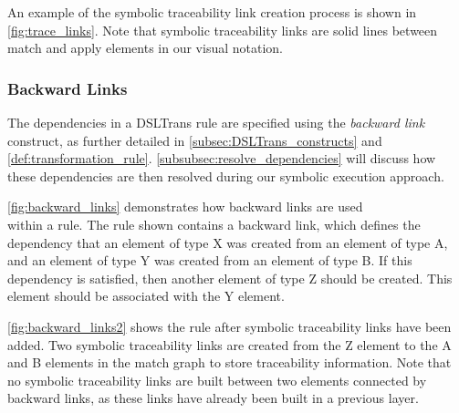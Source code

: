 An example of the symbolic traceability link creation process is shown in
\cref{fig:trace_links}. Note that symbolic traceability links are solid lines between
match and apply elements in our visual notation.



\subsubsection{Backward Links}
\label{subsubsec:backward_links}

The dependencies in a DSLTrans rule are specified using the \textit{backward link} construct, as further detailed in \cref{subsec:DSLTrans_constructs} and \cref{def:transformation_rule}. \cref{subsubsec:resolve_dependencies} will discuss how these dependencies are then resolved during our symbolic execution approach.

\cref{fig:backward_links} demonstrates how backward links are used \\within a rule. The rule shown contains a backward link, which defines the dependency that an element of type X was created from an element of type A, and an element of type Y was created from an element of type B. If this dependency is satisfied, then another element of type Z should be created. This element should be associated with the Y element.


\cref{fig:backward_links2} shows the rule after symbolic traceability links have been added. Two symbolic traceability links are created from the Z element to the A and B elements in the match graph to store traceability information. Note that no symbolic traceability links are built between two elements connected by backward links, as these links have already been built in a previous layer.



